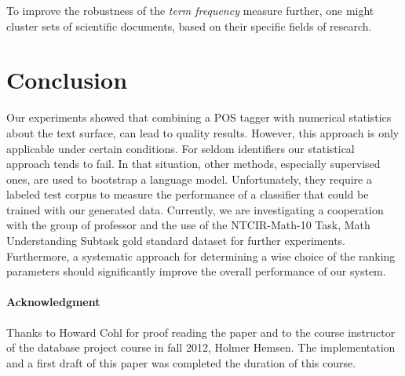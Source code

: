 \documentclass[runningheads]{llncs}
\begin{document}
To improve the robustness of the \emph{term frequency} measure further, one
might cluster sets of scientific documents, based on their specific fields of
research.


\section{Conclusion}
Our experiments showed that combining a POS tagger with numerical statistics
about the text surface, can lead to quality results.
However, this approach is
only applicable under certain conditions. 
For seldom identifiers our statistical approach tends to fail.
In that situation, other methods, especially supervised ones, are used to
bootstrap a language model.
Unfortunately, they require a labeled test
corpus to measure the performance of a classifier that could be trained with our generated data.
Currently, we are investigating a cooperation with the group of professor \citeauthor{Aizawa2013} and the use of the NTCIR-Math-10 Task, Math Understanding Subtask gold standard dataset \cite{Aizawa2013} for further experiments.
Furthermore, a systematic approach for determining a wise choice of the ranking parameters should significantly improve the overall performance of our system.
\paragraph*{Acknowledgment}
Thanks to Howard Cohl for proof reading the paper and to the course instructor of the database project course in fall 2012, Holmer Hemsen. The implementation and a first draft of this paper was completed the duration of this course.


\begingroup
\let\clearpage\relax

\endgroup
\end{document}
